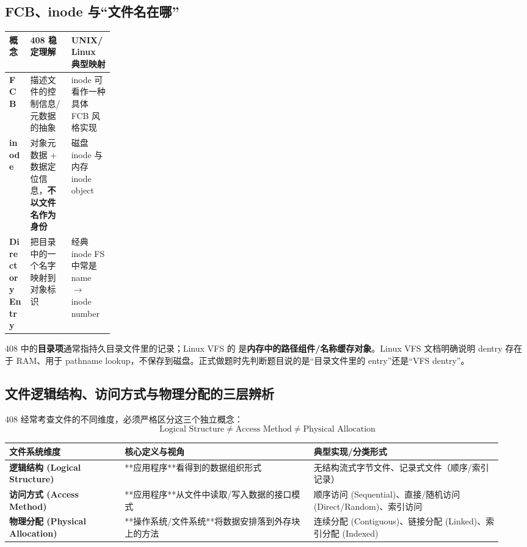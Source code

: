 \documentclass[11pt,a4paper]{ctexart}
\newcommand{\kw}[1]{\textbf{#1}}
\newcommand{\code}[1]{\texttt{\detokenize{#1}}}
\begin{document}
\subsection{FCB、inode 与“文件名在哪”}
\begin{center}
\small
\begin{tabularx}{\linewidth}{>{\bfseries}p{0.20\linewidth} X X}
\toprule
概念 & 408 稳定理解 & UNIX/Linux 典型映射 \\
\midrule
FCB & 描述文件的控制信息/元数据的抽象 & inode 可看作一种具体 FCB 风格实现 \\
inode & 对象元数据 + 数据定位信息，\kw{不以文件名作为身份} & 磁盘 inode 与内存 inode object \\
Directory Entry & 把目录中的一个名字映射到对象标识 & 经典 inode FS 中常是 name $\to$ inode number \\
\bottomrule
\end{tabularx}
\end{center}

\begin{warn}
408 中的\kw{目录项}通常指持久目录文件里的记录；Linux VFS 的 \code{struct dentry} 是\kw{内存中的路径组件/名称缓存对象}。Linux VFS 文档明确说明 dentry 存在于 RAM、用于 pathname lookup，不保存到磁盘。正式做题时先判断题目说的是“目录文件里的 entry”还是“VFS dentry”。
\end{warn}

\subsection{文件逻辑结构、访问方式与物理分配的三层辨析}

408 经常考查文件的不同维度，必须严格区分这三个独立概念：
\[
\boxed{
\text{Logical Structure}
\neq
\text{Access Method}
\neq
\text{Physical Allocation}
}
\]

\begingroup
\small
\renewcommand{\arraystretch}{1.25}
\setlength{\tabcolsep}{6pt}
\begin{tabularx}{\linewidth}{>{\bfseries}p{0.22\linewidth} p{0.36\linewidth} p{0.36\linewidth}}
\toprule
文件系统维度 & 核心定义与视角 & 典型实现/分类形式\\
\midrule
逻辑结构 (Logical Structure) & **应用程序**看得到的数据组织形式 & 无结构流式字节文件、记录式文件（顺序/索引记录）\\
访问方式 (Access Method) & **应用程序**从文件中读取/写入数据的接口模式 & 顺序访问 (Sequential)、直接/随机访问 (Direct/Random)、索引访问\\
物理分配 (Physical Allocation) & **操作系统/文件系统**将数据安排落到外存块上的方法 & 连续分配 (Contiguous)、链接分配 (Linked)、索引分配 (Indexed)\\
\bottomrule
\end{tabularx}
\endgroup
\end{document}
